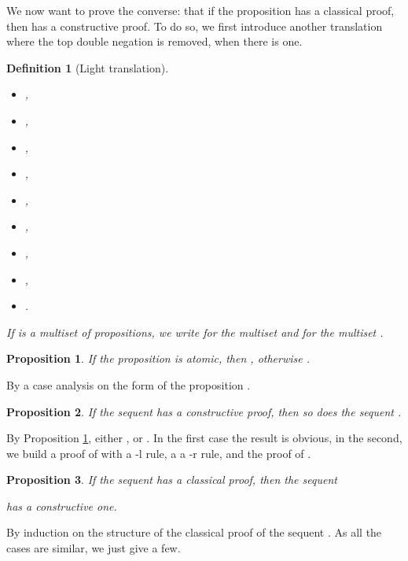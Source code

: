 \documentclass{article}
\newtheorem{definition}{Definition}
\newtheorem{proposition}{Proposition}
\begin{document}
We now want to prove the converse: that if the proposition  has a 
classical proof, then  has a constructive proof.
To do so, we first introduce another translation where the top double
negation is removed, when there is one.
\begin{definition}[Light translation]~
\begin{itemize}
\item ,
\item ,
\item ,
\item , 
\item ,
\item ,
\item ,
\item ,
\item .
\end{itemize}
If  is a multiset of propositions, we write 
 for the multiset  and 
 for the multiset . 
\end{definition}

\begin{proposition}\label{notnot}
If the proposition  is atomic, then , otherwise 
. 
\end{proposition}

By a case analysis on the form of the proposition .

\begin{proposition}\label{oneandtheother}
If the sequent  has a constructive proof, 
then so does the sequent .
\end{proposition}

By Proposition \ref{notnot}, either , or
. In the first case the result is obvious, 
in the second, we build a proof of  with 
a -l rule, a a -r rule, and the proof of .

\begin{proposition}\label{key}
If the sequent  has a classical
proof, then the sequent 

has a constructive one.
\end{proposition}

By induction 
on the structure of the classical proof of the sequent
. 
As all the cases are similar, we just give a few.
\end{document}
